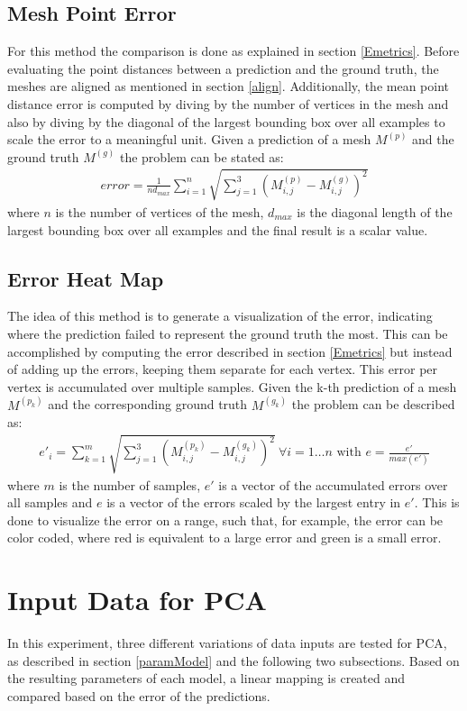 \subsection{Mesh Point Error} %
\label{mpError}
For this method the comparison is done as explained in section \ref{Emetrics}. Before evaluating the point distances between a prediction and the ground truth, the meshes are aligned as mentioned in section \ref{align}. Additionally, the mean point distance error is computed by diving by the number of vertices in the mesh and also by diving by the diagonal of the largest bounding box over all examples to scale the error to a meaningful unit. Given a prediction of a mesh $M^{(p)}$ and the ground truth $M^{(g)}$ the problem can be stated as:
\begin{gather}
error = \frac{1}{nd_{max}}\sum_{i=1}^{n} \sqrt{\sum_{j=1}^3(M_{i,j}^{(p)} - M_{i,j}^{(g)})^2}
\end{gather}
where $n$ is the number of vertices of the mesh, $d_{max}$ is the diagonal length of the largest bounding box over all examples and the final result is a scalar value.
\subsection{Error Heat Map} %
\label{mhError}
The idea of this method is to generate a visualization of the error, indicating where the prediction failed to represent the ground truth the most. This can be accomplished by computing the error described in section \ref{Emetrics} but instead of adding up the errors, keeping them separate for each vertex. This error per vertex is accumulated over multiple samples. Given the  k-th prediction of a mesh $M^{(p_k)}$ and the corresponding ground truth $M^{(g_k)}$ the problem can be described as:
\begin{gather}
e'_{i} = \sum_{k=1}^{m} \sqrt{\sum_{j=1}^3(M_{i,j}^{(p_k)} - M_{i,j}^{(g_k)})^2} \  \forall i=1 \dots n \text{ with } e = \frac{e'}{max(e')}
\end{gather}
where $m$ is the number of samples, $e'$ is a vector of the accumulated errors over all samples and $e$ is a vector of the errors scaled by the largest entry in $e'$. This is done to visualize the error on a range, such that, for example, the error can be color coded, where red is equivalent to a large error and green is a small error.
\section{Input Data for PCA}
In this experiment, three different variations of data inputs are tested for PCA, as described in section \ref{paramModel} and the following two subsections. Based on the resulting parameters of each model, a linear mapping is created and compared based on the error of the predictions.

